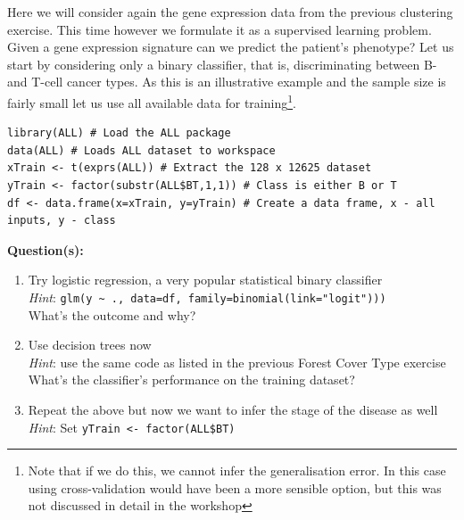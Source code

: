 \documentclass[a4paper,11pt]{article}
\begin{document}
Here we will consider again the gene expression data from the previous clustering exercise. This
time however we formulate it as a supervised learning problem. Given a gene expression signature
can we predict the patient's phenotype? Let us start by considering only a binary classifier, that is,
discriminating between B- and T-cell cancer types. As this is an illustrative example and the sample 
size is fairly small let us use all available data for training\footnote{Note that if we do this, we cannot infer the generalisation error.
In this case using cross-validation would have been a more sensible option, but this was not discussed in detail in the workshop}.
\\
\begin{lstlisting}[style=RCode]
library(ALL) # Load the ALL package
data(ALL) # Loads ALL dataset to workspace
xTrain <- t(exprs(ALL)) # Extract the 128 x 12625 dataset
yTrain <- factor(substr(ALL$BT,1,1)) # Class is either B or T
df <- data.frame(x=xTrain, y=yTrain) # Create a data frame, x - all inputs, y - class
\end{lstlisting}

\begin{framed}
\textbf{Question(s):}
\begin{enumerate}
	\item Try logistic regression, a very popular statistical binary classifier
	\\
	\textit{Hint}: {\lstinline[style=RCode, basicstyle=\normalsize\ttfamily] |glm(y ~ ., data=df, family=binomial(link="logit")))|}
	\\
	What's the outcome and why?
	\item Use decision trees now
	\\
	\textit{Hint}: use the same code as listed in the previous Forest Cover Type exercise 
	\\
	What's the classifier's performance on the training dataset?
	\item Repeat the above but now we want to infer the stage of the disease as well
	\\
	\textit{Hint}: Set {\lstinline[style=RCode, basicstyle=\normalsize\ttfamily] |yTrain <- factor(ALL$BT)|}
	\vspace{-0.5cm} %
\end{enumerate}
\end{framed}

\clearpage
\end{document}
